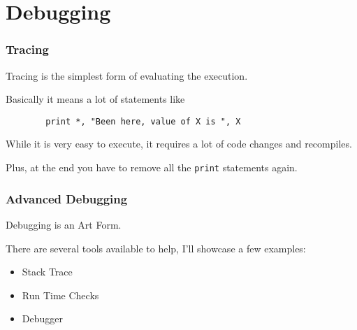 \section{Debugging}

\begin{frame}[fragile]
    \frametitle{Tracing}
    Tracing is the simplest form of evaluating the execution.

    Basically it means a lot of statements like

    \begin{lstlisting}
        print *, "Been here, value of X is ", X
    \end{lstlisting}

    While it is very easy to execute, it requires a lot of code changes and recompiles.

    Plus, at the end you have to remove all the \texttt{print} statements again.
\end{frame}

\begin{frame}
    \frametitle{Advanced Debugging}
    Debugging is an Art Form.

    There are several tools available to help, I'll showcase a few examples:

    \begin{itemize}
        \item Stack Trace
        \item Run Time Checks
        \item Debugger
    \end{itemize}

\end{frame}

